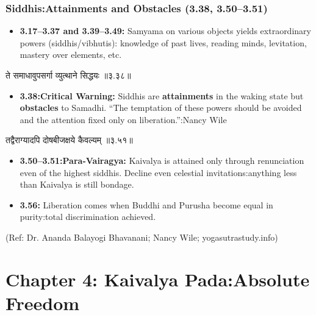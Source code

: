 \begin{frame}[fragile]\frametitle{Siddhis:Attainments and Obstacles (3.38, 3.50–3.51)}

\begin{itemize}
\item \textbf{3.17–3.37 and 3.39–3.49:} Samyama on various objects yields extraordinary powers (siddhis/vibhutis): knowledge of past lives, reading minds, levitation, mastery over elements, etc.
\end{itemize}

\begin{sanskrit}
ते समाधावुपसर्गा व्युत्थाने सिद्धयः ॥३.३८॥
\end{sanskrit}

\begin{itemize}
\item \textbf{3.38:Critical Warning:} Siddhis are \textbf{attainments} in the waking state but \textbf{obstacles} to Samadhi. ``The temptation of these powers should be avoided and the attention fixed only on liberation.'':Nancy Wile
\end{itemize}

\begin{sanskrit}
तद्वैराग्यादपि दोषबीजक्षये कैवल्यम् ॥३.५१॥
\end{sanskrit}

\begin{itemize}
\item \textbf{3.50–3.51:Para-Vairagya:} Kaivalya is attained only through renunciation even of the highest siddhis. Decline even celestial invitations:anything less than Kaivalya is still bondage.
\item \textbf{3.56:} Liberation comes when Buddhi and Purusha become equal in purity:total discrimination achieved.
\end{itemize}

\tiny{(Ref: Dr. Ananda Balayogi Bhavanani; Nancy Wile; yogasutrastudy.info)}

\end{frame}

\section[Kaivalyapad]{Chapter 4: Kaivalya Pada:Absolute Freedom}

